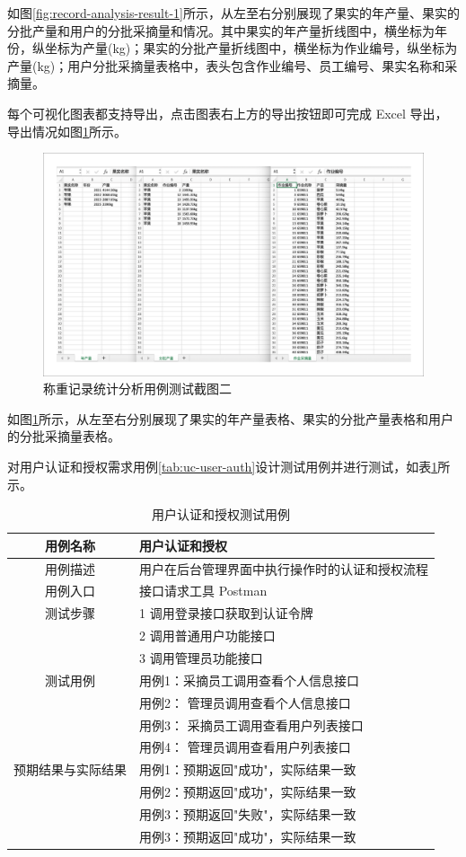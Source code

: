 如图\ref{fig:record-analysis-result-1}所示，从左至右分别展现了果实的年产量、果实的分批产量和用户的分批采摘量和情况。其中果实的年产量折线图中，横坐标为年份，纵坐标为产量(kg)；果实的分批产量折线图中，横坐标为作业编号，纵坐标为产量(kg)；用户分批采摘量表格中，表头包含作业编号、员工编号、果实名称和采摘量。

每个可视化图表都支持导出，点击图表右上方的导出按钮即可完成 Excel 导出，导出情况如图\ref{fig:record-analysis-result-2}所示。

\begin{figure}[H]
    \centering
    \includegraphics[width=0.8\linewidth]{../result/record-analysis-result-2.png}
    \caption{称重记录统计分析用例测试截图二}
    \label{fig:record-analysis-result-2}
\end{figure}

如图\ref{fig:record-analysis-result-2}所示，从左至右分别展现了果实的年产量表格、果实的分批产量表格和用户的分批采摘量表格。

对用户认证和授权需求用例\ref{tab:uc-user-auth}设计测试用例并进行测试，如表\ref{tab:uc-user-auth-test}所示。

\begin{longtable}[ht]{|c|p{8cm}|}
\caption{用户认证和授权测试用例}
\label{tab:uc-user-auth-test}
\\
\hline
用例名称 & 用户认证和授权 \\
\hline
用例描述 & 用户在后台管理界面中执行操作时的认证和授权流程 \\
\hline
用例入口 & 接口请求工具 Postman \\
\hline
测试步骤 & 1 调用登录接口获取到认证令牌 \\
& 2 调用普通用户功能接口 \\
& 3 调用管理员功能接口 \\
\hline
测试用例 & 用例1：采摘员工调用查看个人信息接口 \\
& 用例2： 管理员调用查看个人信息接口 \\
& 用例3： 采摘员工调用查看用户列表接口 \\
& 用例4： 管理员调用查看用户列表接口 \\
\hline
预期结果与实际结果 & 用例1：预期返回"成功"，实际结果一致 \\
& 用例2：预期返回"成功"，实际结果一致 \\
& 用例3：预期返回"失败"，实际结果一致 \\
& 用例3：预期返回"成功"，实际结果一致 \\
\hline
\end{longtable}


